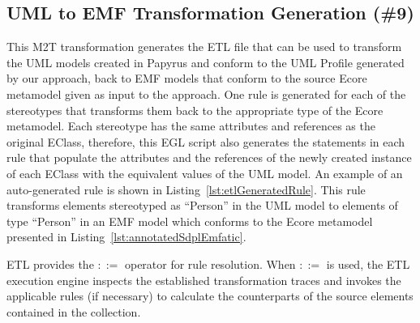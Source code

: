 \subsection{UML to EMF Transformation Generation (\#9)}
\label{sec:uml2emf}


This M2T transformation generates the ETL file that can be used to transform the UML models created in Papyrus and conform to the UML Profile generated by our approach, back to EMF models that conform to the source Ecore metamodel given as input to the approach. 
One rule is generated for each of the stereotypes that transforms them back to the appropriate type of the Ecore metamodel. 
Each stereotype has the same attributes and references as the original EClass, therefore, this EGL script also generates the statements in each rule that populate the attributes and the references of the newly created instance of each EClass with the equivalent values of the UML model. 
An example of an auto-generated rule is shown in Listing~\ref{lst:etlGeneratedRule}. 
This rule transforms elements stereotyped as ``Person'' in the UML model to elements of type ``Person'' in an EMF model which conforms to the Ecore metamodel presented in Listing~\ref{lst:annotatedSdplEmfatic}.



ETL provides the $::=$ operator for rule resolution. 
When $::=$ is used, the ETL execution engine inspects the established transformation traces and invokes the applicable rules (if necessary) to calculate the counterparts of the source elements contained in the collection. 



